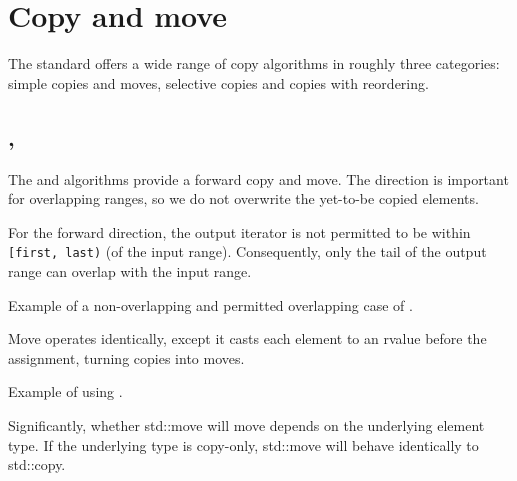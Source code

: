 \section{Copy and move}

The standard offers a wide range of copy algorithms in roughly three categories: simple copies and moves, selective copies and copies with reordering.

\subsection{\texorpdfstring{, }{\texttt{std::copy}, \texttt{std::move}}}

The  and  algorithms provide a forward copy and move. The direction is important for overlapping ranges, so we do not overwrite the yet-to-be copied elements.

For the forward direction, the output iterator is not permitted to be within \texttt{[first, last)} (of the input range). Consequently, only the tail of the output range can overlap with the input range.



\begin{codebox}[]{\href{https://compiler-explorer.com/z/d5c855Gcv}{\ExternalLink}}
\footnotesize Example of a non-overlapping and permitted overlapping case of .
\tcblower
{}
\end{codebox}

Move operates identically, except it casts each element to an rvalue before the assignment, turning copies into moves.

\begin{codebox}[]{\href{https://compiler-explorer.com/z/cP1P3e6q3}{\ExternalLink}}
\footnotesize Example of using .
\tcblower
{}
\end{codebox}

Significantly, whether std::move will move depends on the underlying element type. If the underlying type is copy-only, std::move will behave identically to std::copy.

